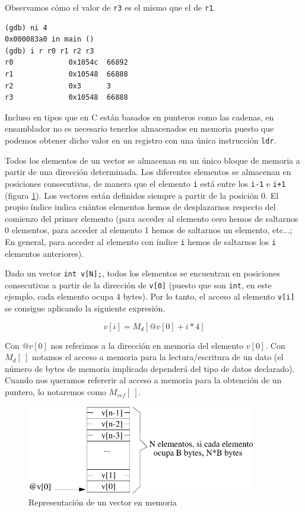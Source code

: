 Observamos cómo el valor de {\tt r3} es el mismo que el de {\tt r1}.

\begin{lstlisting}
(gdb) ni 4
0x000083a0 in main ()
(gdb) i r r0 r1 r2 r3
r0             0x1054c  66892
r1             0x10548  66888
r2             0x3      3
r3             0x10548  66888
\end{lstlisting}

Incluso en tipos que en C están basados en punteros como las cadenas,
en ensamblador no es necesario tenerlos almacenados en memoria puesto
que podemos obtener dicho valor en un registro con una única instrucción {\tt ldr}.

\vspace{0.25cm}
 Todos los elementos de un vector se almacenan en un único
bloque de memoria a partir de una dirección determinada. Los
diferentes elementos se almacenan en posiciones consecutivas, de
manera que el elemento {\tt i}  está entre los {\tt i-1} e {\tt i+1}
(figura \ref{fig:dos_3}). Los
vectores están definidos siempre a partir de la posición 0. El propio
índice indica cuántos elementos hemos de desplazarnos respecto del
comienzo del primer elemento (para acceder al elemento cero hemos de
saltarnos 0 elementos, para acceder al elemento 1 hemos de saltarnos
un elemento, etc...; En general, para acceder al elemento con índice
{\tt i} hemos de saltarnos los {\tt i} elementos anteriores).

Dado un vector {\tt int v[N];}, todos los elementos se encuentran en posiciones
consecutivas a partir de la dirección de {\tt v[0]}
(puesto que son {\tt int}, en este ejemplo, cada elemento ocupa 4 bytes). Por lo tanto,
el acceso al elemento {\tt v[i]} se consigue aplicando la siguiente expresión.

\begin{equation}
v[i] = M_d[@v[0] + i*4] 
\label{eq:uno}
\end{equation}

Con $ @v[0]$ nos referimos a la dirección en memoria del elemento
 $ v[0]$. Con $ M_d[\ ]$ notamos el acceso a memoria para la lectura/escritura
de un dato (el número de bytes de memoria implicado dependerá del tipo
de datos declarado). Cuando nos queramos refererir al acceso a memoria
para la obtención de un puntero, lo notaremos como
$ M_{ref}[\ ]$.

\begin{figure}[h]
  \centering
    \includegraphics[width=10cm]{graphs/2-3.pdf}
  \caption{Representación de un vector en memoria}
  \label{fig:dos_3}
\end{figure}


